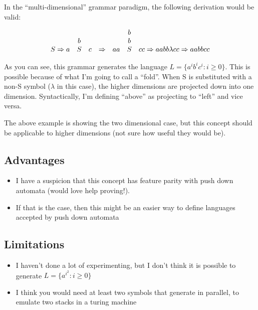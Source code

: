 \documentclass[11pt]{article}
\begin{document}
In the ``multi-dimensional'' grammar paradigm, the following derivation would be
valid:
\begin{tcolorbox}\begin{equation}
\begin{equation}
\begin{matrix}
      &   &   &   &    & b\\
      & b &   &   &    & b\\
 S\Rightarrow a & S & c & \Rightarrow & aa & S & cc \Rightarrow aabb\lambda cc \Rightarrow aabbcc  \end{matrix}
\end{equation}
\end{tcolorbox}

As you can see, this grammar generates the language \(L = \{a^ib^ic^i: i \ge
0\}\). This is possible because of what I'm going to call a ``fold''. When S is
substituted with a non-S symbol (\(\lambda\) in this case), the higher dimensions are projected down into
one dimension. Syntactically, I'm defining ``above'' as projecting to ``left'' and
vice versa.

The above example is showing the two dimensional case, but this concept should
be applicable to higher dimensions (not sure how useful they would be).

\subsection*{Advantages}
\label{sec:orge0b75be}
\begin{itemize}
\item I have a suspicion that this concept has feature parity with push down
automata (would love help proving!).
\item If that is the case, then this might be an easier way to define languages
accepted by push down automata
\end{itemize}
\subsection*{Limitations}
\label{sec:org959a4a2}
\begin{itemize}
\item I haven't done a lot of experimenting, but I don't think it is possible to
generate \(L = \{a^{i^2}: i\ge 0\}\)
\item I think you would need at least two symbols that generate in parallel, to
emulate two stacks in a turing machine
\end{itemize}
\end{document}
